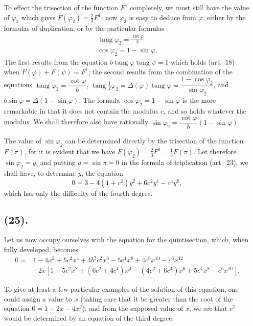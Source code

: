 \documentclass{article}
\begin{document}
To effect the trisection of the function $F^{1}$ completely, we must still have the value of $\varphi_{2}$ which gives $F(\varphi_{2})=\frac{2}{3}F^{1}$: now $\varphi_{2}$ is easy to deduce from $\varphi$, either by the formulas of duplication, or by the particular formulas
\[ \begin{gathered} \operatorname{tang}\varphi_{2}=\frac{\cot\varphi}{b} \\ \cos\varphi_{2}=1-\sin\varphi. \end{gathered} \]
The first results from the equation $b\operatorname{tang}\varphi\operatorname{tang}\psi=1$ which holds (art.~18) when $F(\varphi)+F(\psi)=F^{1}$; the second results from the combination of the equations $\operatorname{tang}\varphi_{2}=\dfrac{\cot\varphi}{b}$, $\operatorname{tang}\frac{1}{2}\varphi_{2}=\Delta(\varphi)\operatorname{tang}\varphi=\dfrac{1-\cos\varphi_{2}}{\sin\varphi_{2}}$, and $b\sin\varphi=\Delta(1-\sin\varphi)$. The formula $\cos\varphi_{2}=1-\sin\varphi$ is the more remarkable in that it does not contain the modulus $c$, and so holds whatever the modulus. We shall therefore also have rationally $\sin\varphi_{2}=\dfrac{\cot\varphi}{b}(1-\sin\varphi)$.

The value of $\sin\varphi_{2}$ can be determined directly by the trisection of the function $F(\pi)$, for it is evident that we have $F(\varphi_{2})=\frac{2}{3}F^{1}=\frac{1}{3}F(\pi)$. Let therefore $\sin\varphi_{2}=y$, and putting $a=\sin\pi=0$ in the formula of triplication (art.~23), we shall have, to determine $y$, the equation
\[ 0=3-4(1+c^{2})y^{2}+6c^{2}y^{4}-c^{4}y^{8}, \]
which has only the difficulty of the fourth degree.

\subsection*{(25).}

Let us now occupy ourselves with the equation for the quintisection, which, when fully developed, becomes
\[ \begin{aligned} 0={}&1-4x^{2}+5c^{2}x^{4}+4b^{2}c^{2}x^{6}-5c^{4}x^{8}+4c^{6}x^{10}-c^{6}x^{12} \\ &-2x[1-5c^{2}x^{2}+(6c^{2}+4c^{4})x^{4}-(4c^{2}+6c^{4})x^{6}+5c^{4}x^{8}-c^{6}x^{10}]. \end{aligned} \]

To give at least a few particular examples of the solution of this equation, one could assign a value to $x$ (taking care that it be greater than the root of the equation $0=1-2x-4x^{2}$); and from the supposed value of $x$, we see that $c^{2}$ would be determined by an equation of the third degree.
\end{document}
